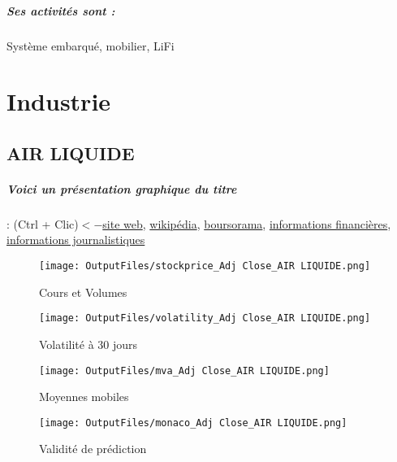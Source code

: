 \documentclass[11pt,a4paper]{report}%
\begin{document}
\paragraph{Ses activités sont : } Système embarqué, mobilier, LiFi 
    
    \newpage\chapter{Industrie}


\section{AIR LIQUIDE}

\paragraph{Voici un présentation graphique du titre} : (Ctrl + Clic)$<-$\href{https://www.airliquide.com/fr/investisseurs}{site web}, \href{https://fr.wikipedia.org/wiki/Air_liquide}{wikipédia}, \href{https://www.boursorama.com/cours/1rPAI}{boursorama}, \href{https://www.qwant.com/?q=site:https:%2f%2fwww.easybourse.com%2faction-societe%2fAIR-LIQUIDE&t=web&client=ext-firefox-hp}{informations financières}, \href{https://bourse.lerevenu.com/cours-de-bourse/fiche-valeur-synthese/AIR-LIQUIDE/AI-FR}{informations journalistiques}
\begin{figure}[!htb]
   \begin{minipage}{0.5\textwidth}
     \centering
     \texttt{[image: OutputFiles/stockprice\_Adj Close\_AIR LIQUIDE.png]}
     \caption{Cours et Volumes}\label{Fig:price_AIR LIQUIDE}
   \end{minipage}\hfill
   \begin{minipage}{0.5\textwidth}
     \centering
     \texttt{[image: OutputFiles/volatility\_Adj Close\_AIR LIQUIDE.png]}
     \caption{Volatilité à 30 jours}\label{Fig:volat_AIR LIQUIDE}
   \end{minipage}
\end{figure}
\begin{figure}[!htb]
   \begin{minipage}{0.5\textwidth}
     \centering
     \texttt{[image: OutputFiles/mva\_Adj Close\_AIR LIQUIDE.png]}
     \caption{Moyennes mobiles}\label{Fig:mva_AIR LIQUIDE}
   \end{minipage}\hfill
   \begin{minipage}{0.5\textwidth}
     \centering
     \texttt{[image: OutputFiles/monaco\_Adj Close\_AIR LIQUIDE.png]}
     \caption{Validité de prédiction}\label{Fig:prediction_AIR LIQUIDE}
   \end{minipage}
\end{figure}
\end{document}
